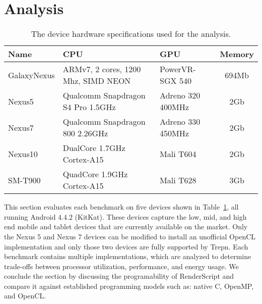 \section{Analysis}
\label{sec:analysis}


\begin{table}
\centering
\begin{tabular}{ | l | p{2.1cm} | p{1.7cm} | c |}
    \hline 
    Name & CPU & GPU & Memory \\ \hline
    GalaxyNexus & ARMv7, 2 cores, 1200 Mhz, SIMD NEON & PowerVR-SGX 540 & 694Mb \\ \hline
    Nexus5 & Qualcomm Snapdragon S4 Pro 1.5GHz & Adreno 320 400MHz & 2Gb \\ \hline
    Nexus7 & Qualcomm Snapdragon 800 2.26GHz & Adreno 330 450MHz & 2Gb \\ \hline
    Nexus10 & DualCore 1.7GHz Cortex-A15 & Mali T604 & 2Gb \\ \hline
    SM-T900 & QuadCore 1.9GHz Cortex-A15 & Mali T628 & 3Gb \\ \hline
    \hline
\end{tabular}
\caption{The device hardware specifications used for the analysis.}
\label{table:hardware}
\end{table}

This section evaluates each benchmark on five devices shown
  in Table~\ref{table:hardware}, all running Android $4.4.2$ (KitKat).
These devices capture the low, mid, and high end mobile and tablet
  devices that are currently available on the market.
Only the Nexus 5 and Nexus 7 devices can be modified to install an
  unofficial OpenCL implementation and only those two devices are fully supported
  by Trepn.
Each benchmark contains multiple implementations, which 
  are analyzed to determine trade-offs between
  processor utilization, performance, and energy usage.
We conclude the section by discussing the programability of RenderScript
  and compare it against established programming models such as:
  native C, OpenMP, and OpenCL.







